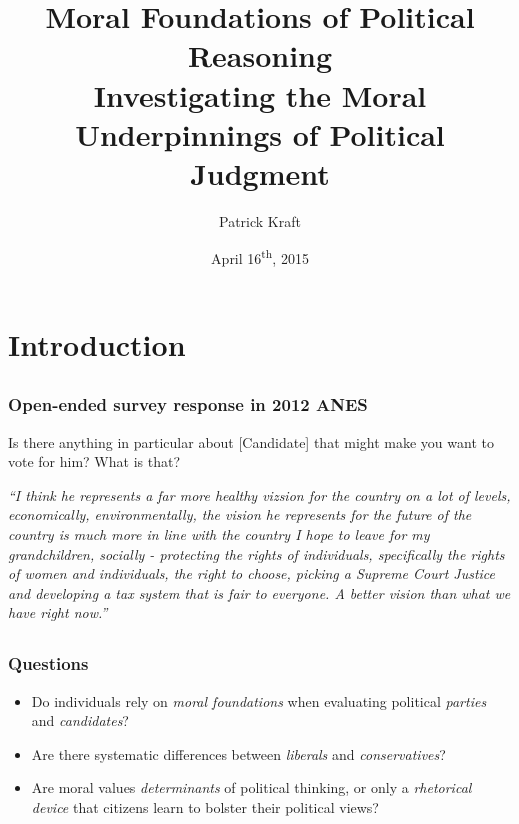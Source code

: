\documentclass{beamer}
\author[Patrick Kraft]{Patrick Kraft}
\institute[Stony Brook]{73rd MPSA Conference}
\title[Moral Foundations of Political Reasoning]{Moral Foundations of Political Reasoning \\ {\small Investigating the Moral Underpinnings of Political Judgment}}
\date{April 16\textsuperscript{th}, 2015}
\begin{document}
\frame{\titlepage}


\section{Introduction}
\subsection{}
\begin{frame}%
\frametitle{Open-ended survey response in 2012 ANES}
\begin{exampleblock}{Is there anything in particular about [Candidate] that might make you want to vote for him? What is that?}
  \begin{center}
    \textit{``I think he represents a far more healthy vizsion for the country on a lot of levels, economically, environmentally, the vision he represents for the future of the country is much more in line with the country I hope to leave for my grandchildren, socially - protecting the rights of individuals, specifically the rights of women and individuals, the right to choose, picking a Supreme Court Justice and developing a tax system that is fair to everyone. A better vision than what we have right now.''}
  \end{center}
\end{exampleblock}
\end{frame}

\subsection{}
\begin{frame}%
  \frametitle{Questions}
  \begin{itemize}
    \item Do individuals rely on \emph{moral foundations} when evaluating political \emph{parties} and \emph{candidates}?
    \item Are there systematic differences between \emph{liberals} and \emph{conservatives}?
    \item Are moral values \emph{determinants} of political thinking, or only a \emph{rhetorical device} that citizens learn to bolster their political views?
  \end{itemize}
\end{frame}
\end{document}
